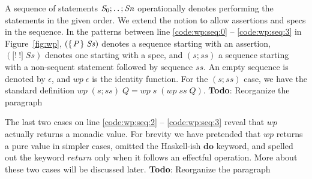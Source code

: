 \documentclass[runningheads]{llncs}
\newcommand{\Conid}[1]{\mathit{#1}}
\newcommand{\Varid}[1]{\mathit{#1}}
\let\Varid\mathit
\let\Conid\mathit
\newcommand{\todo}[1]{{\bf Todo}: \lbrack #1 \rbrack}
\begin{document}
A sequence of statements \ensuremath{\Conid{S}_{0};\mathinner{\ldotp\ldotp};\Conid{Sn}} operationally denotes performing the statements in the given order.
We extend the notion to allow assertions and specs in the sequence.
In the patterns between line \ref{code:wp:seq:0} -- \ref{code:wp:seq:3} in Figure~\ref{fig:wp},
\ensuremath{(\{\mskip1.5mu \Conid{P}\mskip1.5mu\}\;\Conid{Ss})} denotes a sequence starting with an assertion,
\ensuremath{(\lbrack!~!\rbrack\;\Conid{Ss})} denotes one starting with a spec,
and \ensuremath{(\Varid{s};\Varid{ss})} a sequence starting with a non-sequent statement followed by sequence \ensuremath{\Varid{ss}}.
An empty sequence is denoted by \ensuremath{\epsilon}, and \ensuremath{\Varid{wp}\;\epsilon} is the identity function.
For the \ensuremath{(\Varid{s};\Varid{ss})} case, we have the standard definition \ensuremath{\Varid{wp}\;(\Varid{s};\Varid{ss})\;\Conid{Q}\mathrel{=}\Varid{wp}\;\Varid{s}\;(\Varid{wp}\;\Varid{ss}\;\Conid{Q})}.
\todo{Reorganize the paragraph}

The last two cases on line \ref{code:wp:seq:2} -- \ref{code:wp:seq:3} reveal that \ensuremath{\Varid{wp}} actually returns a monadic value.
For brevity we have pretended that \ensuremath{\Varid{wp}} returns a pure value in simpler cases,
omitted the Haskell-ish \ensuremath{\mathbf{do}} keyword,
and spelled out the keyword \ensuremath{\Varid{return}} only when it follows an effectful operation.
More about these two cases will be discussed later.
\todo{Reorganize the paragraph}

\end{document}
